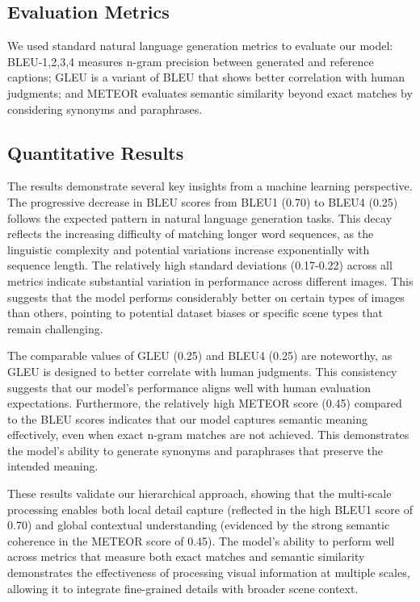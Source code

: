 \documentclass[10pt,twocolumn,letterpaper]{article}
\begin{document}
\subsection{Evaluation Metrics}

We used standard natural language generation metrics to evaluate our model: BLEU-1,2,3,4 measures n-gram precision between generated and reference captions; GLEU is a variant of BLEU that shows better correlation with human judgments; and METEOR evaluates semantic similarity beyond exact matches by considering synonyms and paraphrases.

\subsection{Quantitative Results}

The results demonstrate several key insights from a machine learning perspective. The progressive decrease in BLEU scores from BLEU1 (0.70) to BLEU4 (0.25) follows the expected pattern in natural language generation tasks. This decay reflects the increasing difficulty of matching longer word sequences, as the linguistic complexity and potential variations increase exponentially with sequence length. The relatively high standard deviations (0.17-0.22) across all metrics indicate substantial variation in performance across different images. This suggests that the model performs considerably better on certain types of images than others, pointing to potential dataset biases or specific scene types that remain challenging.

The comparable values of GLEU (0.25) and BLEU4 (0.25) are noteworthy, as GLEU is designed to better correlate with human judgments. This consistency suggests that our model's performance aligns well with human evaluation expectations. Furthermore, the relatively high METEOR score (0.45) compared to the BLEU scores indicates that our model captures semantic meaning effectively, even when exact n-gram matches are not achieved. This demonstrates the model's ability to generate synonyms and paraphrases that preserve the intended meaning.


These results validate our hierarchical approach, showing that the multi-scale processing enables both local detail capture (reflected in the high BLEU1 score of 0.70) and global contextual understanding (evidenced by the strong semantic coherence in the METEOR score of 0.45). The model's ability to perform well across metrics that measure both exact matches and semantic similarity demonstrates the effectiveness of processing visual information at multiple scales, allowing it to integrate fine-grained details with broader scene context.
\end{document}
